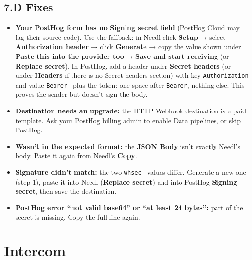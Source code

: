 \documentclass[11pt,a4paper]{article}
\newcommand{\ui}[1]{\textbf{#1}}
\newcommand{\lit}[1]{\texttt{#1}}
\begin{document}
\subsection*{7.D Fixes}
\begin{itemize}
\item \textbf{Your PostHog form has no \ui{Signing secret} field} (PostHog Cloud may lag their source code). Use the fallback: in Needl click \ui{Setup} → select \ui{Authorization header} → click \ui{Generate} → copy the value shown under \ui{Paste this into the provider too} → \ui{Save and start receiving} (or \ui{Replace secret}). In PostHog, add a header under \ui{Secret headers} (or under \ui{Headers} if there is no Secret headers section) with key \lit{Authorization} and value \lit{Bearer } plus the token: one space after \lit{Bearer}, nothing else. This proves the sender but doesn't sign the body.
\item \textbf{Destination needs an upgrade:} the HTTP Webhook destination is a paid template. Ask your PostHog billing admin to enable Data pipelines, or skip PostHog.
\item \textbf{Wasn't in the expected format:} the \ui{JSON Body} isn't exactly Needl's body. Paste it again from Needl's \ui{Copy}.
\item \textbf{Signature didn't match:} the two \lit{whsec\_} values differ. Generate a new one (step 1), paste it into Needl (\ui{Replace secret}) and into PostHog \ui{Signing secret}, then save the destination.
\item \textbf{PostHog error “not valid base64” or “at least 24 bytes”:} part of the secret is missing. Copy the full line again.
\end{itemize}

\clearpage
\section{Intercom}
\end{document}
